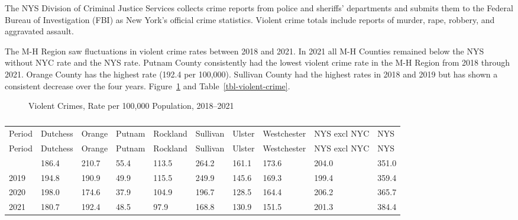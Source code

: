 \documentclass[
  english,
  letterpaper,
]{report}
\begin{document}
The NYS Division of Criminal Justice Services collects crime reports
from police and sheriffs' departments and submits them to the Federal
Bureau of Investigation (FBI) as New York's official crime statistics.
Violent crime totals include reports of murder, rape, robbery, and
aggravated assault.

The M-H Region saw fluctuations in violent crime rates between 2018 and
2021. In 2021 all M-H Counties remained below the NYS without NYC rate
and the NYS rate. Putnam County consistently had the lowest violent
crime rate in the M-H Region from 2018 through 2021. Orange County has
the highest rate (192.4 per 100,000). Sullivan County had the highest
rates in 2018 and 2019 but has shown a consistent decrease over the four
years. Figure~\ref{fig-violent-crime} and Table~\ref{tbl-violent-crime}.

\begin{figure}


\caption{\label{fig-violent-crime}Violent Crimes, Rate per 100,000
Population, 2018--2021}

\end{figure}%

\begin{longtable}[]{@{}llllllllll@{}}

\caption{\label{tbl-violent-crime}Violent Crimes, Rate per 100,000
Population, 2018--2021}

\tabularnewline

\caption{}\label{T_b40a3}\tabularnewline
\toprule\noalign{}
Period & Dutchess & Orange & Putnam & Rockland & Sullivan & Ulster &
Westchester & NYS excl NYC & NYS \\
\midrule\noalign{}
\endfirsthead
\toprule\noalign{}
Period & Dutchess & Orange & Putnam & Rockland & Sullivan & Ulster &
Westchester & NYS excl NYC & NYS \\
\midrule\noalign{}
\endhead
\bottomrule\noalign{}
\endlastfoot
2018 & 186.4 & 210.7 & 55.4 & 113.5 & 264.2 & 161.1 & 173.6 & 204.0 &
351.0 \\
2019 & 194.8 & 190.9 & 49.9 & 115.5 & 249.9 & 145.6 & 169.3 & 199.4 &
359.4 \\
2020 & 198.0 & 174.6 & 37.9 & 104.9 & 196.7 & 128.5 & 164.4 & 206.2 &
365.7 \\
2021 & 180.7 & 192.4 & 48.5 & 97.9 & 168.8 & 130.9 & 151.5 & 201.3 &
384.4 \\

\end{longtable}
\end{document}
